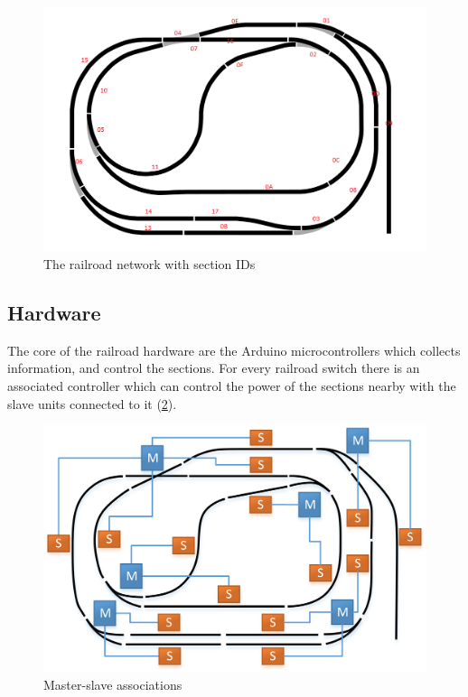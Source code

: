\begin{figure}[h]
	\centering
	\includegraphics[width=\linewidth]{include/figures/chapter_6/total_view_1}
	\caption{The railroad network with section IDs}
	\label{fig:case_study:total_map}
\end{figure}

\subsection{Hardware}
The core of the railroad hardware are the Arduino microcontrollers which collects information, and control the sections. For every railroad switch there is an associated controller which can control the power of the sections nearby with the slave units connected to it (\cref{fig:case_study:master_slave}).

\begin{figure}[h]
	\centering
	\includegraphics[width=\linewidth]{include/figures/chapter_6/railroad_ms}
	\caption{Master-slave associations}
	\label{fig:case_study:master_slave}
\end{figure}


